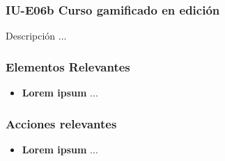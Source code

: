 
\subsubsection{IU-E06b Curso gamificado en edición}

 Descripción ...


\subsubsection{Elementos Relevantes}

    \begin{itemize}
    \item {\bf Lorem ipsum}
        ...
    \end{itemize}

\subsubsection{Acciones relevantes}

    \begin{itemize}
    \item {\bf Lorem ipsum}
        ...
    \end{itemize}

\clearpage
